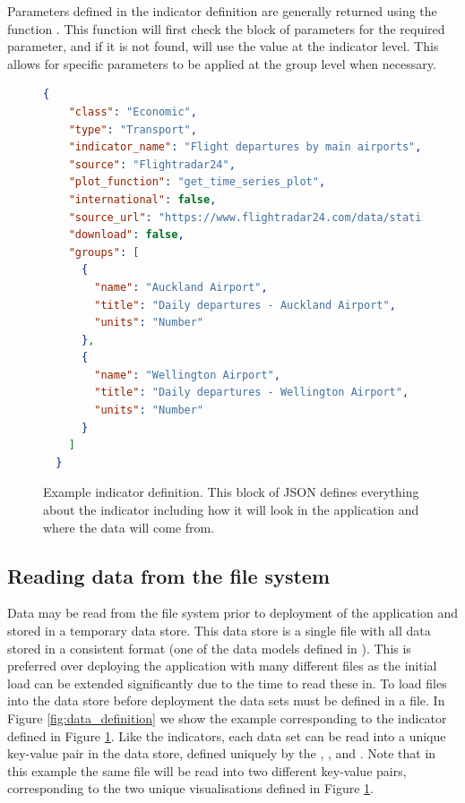 \documentclass[12pt]{article}
\begin{document}
Parameters defined in the indicator definition are generally returned using the function .  This function will first check the  block of parameters for the required parameter, and if it is not found, will use the value at the indicator level.  This allows for specific parameters to be applied at the group level when necessary.

\begin{figure}[h!]
\footnotesize
\begin{lstlisting}[language=json,firstnumber=1]
  {
    "class": "Economic",
    "type": "Transport",
    "indicator_name": "Flight departures by main airports",
    "source": "Flightradar24",
    "plot_function": "get_time_series_plot",
    "international": false,
    "source_url": "https://www.flightradar24.com/data/statistics",
    "download": false,
    "groups": [
      {
        "name": "Auckland Airport",
        "title": "Daily departures - Auckland Airport",
        "units": "Number"
      },
      {
        "name": "Wellington Airport",
        "title": "Daily departures - Wellington Airport",
        "units": "Number"
      }
    ]
  }
\end{lstlisting}
\caption{Example indicator definition.  This block of JSON defines everything about the indicator including how it will look in the application and where the data will come from.}\label{fig:indicator_definition}
\end{figure}


\subsection{Reading data from the file system}\label{sec:data_definition}

Data may be read from the file system prior to deployment of the application and stored in a temporary data store.  This data store is a single file with all data stored in a consistent format (one of the data models defined in ).  This is preferred over deploying the application with many different files as the initial load can be extended significantly due to the time to read these in.  To load files into the data store before deployment the data sets must be defined in a  file.  In Figure \ref{fig:data_definition} we show the example corresponding to the indicator defined in Figure \ref{fig:indicator_definition}.  Like the indicators, each data set can be read into a unique key-value pair in the data store, defined uniquely by the , ,  and .  Note that in this example the same file will be read into two different key-value pairs, corresponding to the two unique visualisations defined in Figure \ref{fig:indicator_definition}.
\end{document}
